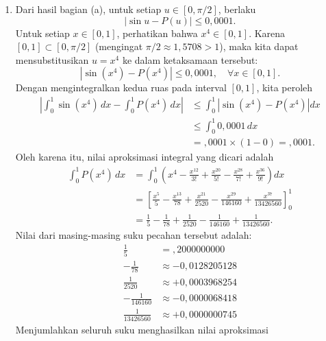 \documentclass[a4paper]{article}
\begin{document}
\begin{enumerate}
\begin{enumerate}[label=(\alph*)]
          \item Dari hasil bagian (a), untuk setiap $u \in [0, \pi/2]$, berlaku
                \[
                  |\sin u - P(u)| \le 0{,}0001.
                \]
                Untuk setiap $x \in [0, 1]$, perhatikan bahwa $x^4 \in [0, 1]$. Karena $[0, 1] \subset [0, \pi/2]$ (mengingat $\pi/2 \approx 1{,}5708 > 1$), maka kita dapat mensubstitusikan $u = x^4$ ke dalam ketaksamaan tersebut:
                \[
                  |\sin(x^4) - P(x^4)| \le 0{,}0001, \quad \forall x \in [0, 1].
                \]
                Dengan mengintegralkan kedua ruas pada interval $[0, 1]$, kita peroleh
                \begin{align*}
                  \left| \int_0^1 \sin(x^4) \, dx - \int_0^1 P(x^4) \, dx \right|
                   & \le \int_0^1 \left| \sin(x^4) - P(x^4) \right| dx \\
                   & \le \int_0^1 0{,}0001 \, dx                       \\
                   & = {,}0001 \times (1 - 0) = {,}0001.
                \end{align*}
                Oleh karena itu, nilai aproksimasi integral yang dicari adalah
                \begin{align*}
                  \int_0^1 P(x^4) \, dx
                   & = \int_0^1 \left( x^4 - \frac{x^{12}}{3!} + \frac{x^{20}}{5!} - \frac{x^{28}}{7!} + \frac{x^{36}}{9!} \right) dx               \\
                   & = \left[ \frac{x^5}{5} - \frac{x^{13}}{78} + \frac{x^{21}}{2520} - \frac{x^{29}}{146160} + \frac{x^{37}}{13426560} \right]_0^1 \\
                   & = \frac{1}{5} - \frac{1}{78} + \frac{1}{2520} - \frac{1}{146160} + \frac{1}{13426560}.
                \end{align*}
                Nilai dari masing-masing suku pecahan tersebut adalah:
                \begin{align*}
                  \frac{1}{5}        & = {,}2000000000         \\
                  -\frac{1}{78}      & \approx -0{,}0128205128 \\
                  \frac{1}{2520}     & \approx +0{,}0003968254 \\
                  -\frac{1}{146160}  & \approx -0{,}0000068418 \\
                  \frac{1}{13426560} & \approx +0{,}0000000745
                \end{align*}
                Menjumlahkan seluruh suku menghasilkan nilai aproksimasi

\end{enumerate}
\end{enumerate}
\end{document}
